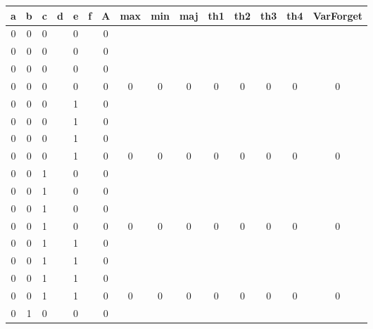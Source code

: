 \begin{table}[!tb]
    \centering
    \begin{tabular}{|c|c|c|c|c|c|c|c|c|c|c|c|c|c|c|}
        \hline
        \textbf{a} & \textbf{b} & \textbf{c} & \textbf{d} & \textbf{e} & \textbf{f} & \textbf{A} & \textbf{max} & \textbf{min} & \textbf{maj} & \textbf{th1} & \textbf{th2} & \textbf{th3} & \textbf{th4} & \textbf{VarForget} \\ \hline
        \rowcolor{gray!40} 0 & 0 & 0 &  & 0 &  & 0 &  &  &  &  &  &  &  &  \\ \hline
        \rowcolor{gray!40} 0 & 0 & 0 &  & 0 &  & 0 &  &  &  &  &  &  &  &  \\ \hline
        \rowcolor{gray!40} 0 & 0 & 0 &  & 0 &  & 0 &  &  &  &  &  &  &  &  \\ \hline
        \rowcolor{gray!40} 0 & 0 & 0 &  & 0 &  & 0 & 0 & 0 & 0 & 0 & 0 & 0 & 0 & 0 \\ \hline
        \rowcolor{blue!40} 0 & 0 & 0 &  & 1 &  & 0 &  &  &  &  &  &  &  &  \\ \hline
        \rowcolor{blue!40} 0 & 0 & 0 &  & 1 &  & 0 &  &  &  &  &  &  &  &  \\ \hline
        \rowcolor{blue!40} 0 & 0 & 0 &  & 1 &  & 0 &  &  &  &  &  &  &  &  \\ \hline
        \rowcolor{blue!40} 0 & 0 & 0 &  & 1 &  & 0 & 0 & 0 & 0 & 0 & 0 & 0 & 0 & 0 \\ \hline
        \rowcolor{red!40} 0 & 0 & 1 &  & 0 &  & 0 &  &  &  &  &  &  &  &  \\ \hline
        \rowcolor{red!40} 0 & 0 & 1 &  & 0 &  & 0 &  &  &  &  &  &  &  &  \\ \hline
        \rowcolor{red!40} 0 & 0 & 1 &  & 0 &  & 0 &  &  &  &  &  &  &  &  \\ \hline
        \rowcolor{red!40} 0 & 0 & 1 &  & 0 &  & 0 & 0 & 0 & 0 & 0 & 0 & 0 & 0 & 0 \\ \hline
        \rowcolor{green!40} 0 & 0 & 1 &  & 1 &  & 0 &  &  &  &  &  &  &  &  \\ \hline
        \rowcolor{green!40} 0 & 0 & 1 &  & 1 &  & 0 &  &  &  &  &  &  &  &  \\ \hline
        \rowcolor{green!40} 0 & 0 & 1 &  & 1 &  & 0 &  &  &  &  &  &  &  &  \\ \hline
        \rowcolor{green!40} 0 & 0 & 1 &  & 1 &  & 0 & 0 & 0 & 0 & 0 & 0 & 0 & 0 & 0 \\ \hline
        \rowcolor{yellow!40} 0 & 1 & 0 &  & 0 &  & 0 &  &  &  &  &  &  &  &  \\ \hline

\end{tabular}
\end{table}
